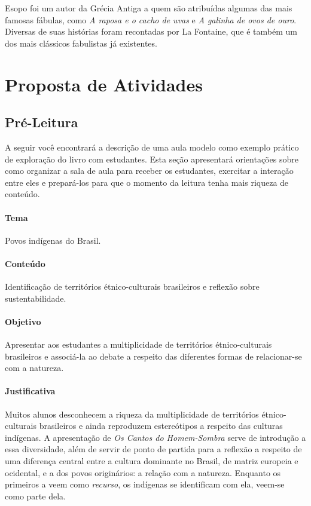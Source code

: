 \documentclass[11pt]{extarticle}
\begin{document}
Esopo foi um autor da Grécia Antiga a quem são atribuídas algumas das mais famosas fábulas, como \textit{A raposa e o cacho de uvas} e \textit{A galinha de ovos de ouro}. Diversas de suas histórias foram recontadas por La Fontaine, que é também um dos mais clássicos fabulistas já existentes.

\section{Proposta de Atividades}
\subsection{Pré-Leitura}

A seguir você encontrará a descrição de uma aula modelo como exemplo prático de exploração do livro com estudantes. Esta seção apresentará orientações sobre como organizar a sala de aula para receber os estudantes, exercitar a interação entre eles e prepará-los para que o momento da leitura tenha mais riqueza de conteúdo.

\paragraph{Tema} Povos indígenas do Brasil.  

\paragraph{Conteúdo} Identificação de territórios étnico-culturais brasileiros e reflexão sobre sustentabilidade. 

\paragraph{Objetivo} Apresentar aos estudantes a multiplicidade de territórios étnico-culturais brasileiros e associá-la ao debate a respeito das diferentes formas de relacionar-se com a natureza.  

\paragraph{Justificativa} Muitos alunos desconhecem a riqueza da multiplicidade de territórios étnico-culturais brasileiros e ainda reproduzem estereótipos a respeito das culturas indígenas. A apresentação de \textit{Os Cantos do Homem-Sombra} serve de introdução a essa diversidade, além de servir de ponto de partida para a reflexão a respeito de uma diferença central entre a cultura dominante no Brasil, de matriz europeia e ocidental, e a dos povos originários: a relação com a natureza. Enquanto os primeiros a veem como \textit{recurso}, os indígenas se identificam com ela, veem-se como parte dela.      
\end{document}
